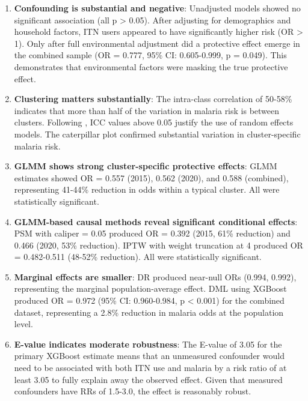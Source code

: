 \begin{enumerate}
	\item \textbf{Confounding is substantial and negative}: Unadjusted models showed no significant association (all p > 0.05). After adjusting for demographics and household factors, ITN users appeared to have significantly higher risk (OR > 1). Only after full environmental adjustment did a protective effect emerge in the combined sample (OR = 0.777, 95\% CI: 0.605-0.999, p = 0.049). This demonstrates that environmental factors were masking the true protective effect.
	
	\item \textbf{Clustering matters substantially}: The intra-class correlation of 50-58\% indicates that more than half of the variation in malaria risk is between clusters. Following \citet{killip2004intracluster}, ICC values above 0.05 justify the use of random effects models. The caterpillar plot confirmed substantial variation in cluster-specific malaria risk.
	
	\item \textbf{GLMM shows strong cluster-specific protective effects}: GLMM estimates showed OR = 0.557 (2015), 0.562 (2020), and 0.588 (combined), representing 41-44\% reduction in odds within a typical cluster. All were statistically significant.
	
	\item \textbf{GLMM-based causal methods reveal significant conditional effects}: PSM with caliper = 0.05 produced OR = 0.392 (2015, 61\% reduction) and 0.466 (2020, 53\% reduction). IPTW with weight truncation at 4 produced OR = 0.482-0.511 (48-52\% reduction). All were statistically significant.
	
	\item \textbf{Marginal effects are smaller}: DR produced near-null ORs (0.994, 0.992), representing the marginal population-average effect. DML using XGBoost produced OR = 0.972 (95\% CI: 0.960-0.984, p < 0.001) for the combined dataset, representing a 2.8\% reduction in malaria odds at the population level.
	
	\item \textbf{E-value indicates moderate robustness}: The E-value of 3.05 for the primary XGBoost estimate means that an unmeasured confounder would need to be associated with both ITN use and malaria by a risk ratio of at least 3.05 to fully explain away the observed effect. Given that measured confounders have RRs of 1.5-3.0, the effect is reasonably robust.
	

\end{enumerate}
